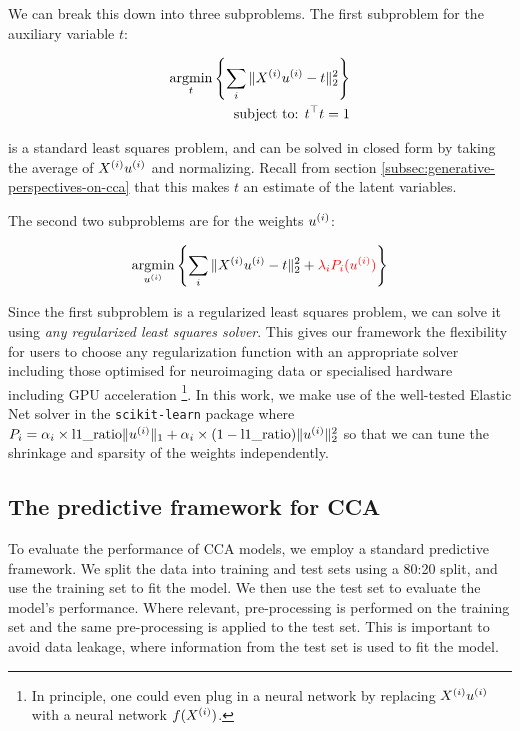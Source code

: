 We can break this down into three subproblems.
The first subproblem for the auxiliary variable \(t\):

\begin{align}
    \underset{t}{\mathrm{argmin}}\left\{\sum_i \|X^{(i)} u^{(i)} - t\|_2^2\right\}\\
    \text{subject to: }t^\top t = 1\\
\end{align}

is a standard least squares problem, and can be solved in closed form by taking the average of $X^{(i)} u^{(i)}$ and normalizing.
Recall from section \ref{subsec:generative-perspectives-on-cca} that this makes $t$ an estimate of the latent variables.

The second two subproblems are for the weights \(u^{(i)}\):

\begin{align}
    \underset{u^{(i)}}{\mathrm{argmin}}\left\{\sum_i \|X^{(i)} u^{(i)} - t\|_2^2 + \textcolor{red}{\lambda_i P_i(u^{(i)})} \right\}\\
\end{align}

Since the first subproblem is a regularized least squares problem, we can solve it using \textit{any regularized least squares solver}.
This gives our framework the flexibility for users to choose any regularization function with an appropriate solver including those optimised for neuroimaging data\citep{Nilearn_contributors_Nilearn} or specialised hardware including GPU acceleration
\footnote{In principle, one could even plug in a neural network by replacing $X^{(i)} u^{(i)}$ with a neural network $f(X^{(i)})$.}.
In this work, we make use of the well-tested Elastic Net solver in the \texttt{scikit-learn} package \citep{pedregosa2011scikit} where $P_i=\alpha_i \times \text{l1\_ratio} \|u^{(i)}\|_1 + \alpha_i \times (1-\text{l1\_ratio}) \|u^{(i)}\|^2_2$ so that we can tune the shrinkage and sparsity of the weights independently.

\subsection{The predictive framework for CCA}


To evaluate the performance of CCA models, we employ a standard predictive framework.
We split the data into training and test sets using a 80:20 split, and use the training set to fit the model.
We then use the test set to evaluate the model's performance.
Where relevant, pre-processing is performed on the training set and the same pre-processing is applied to the test set.
This is important to avoid data leakage, where information from the test set is used to fit the model.


